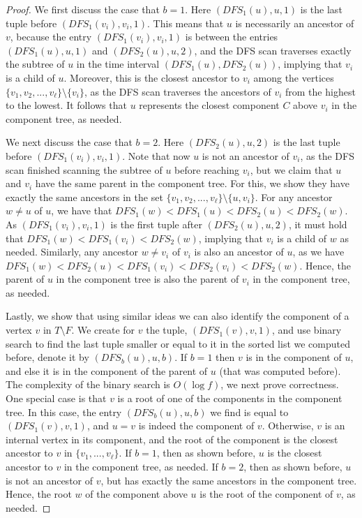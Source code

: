 \begin{proof}
We first discuss the case that $b=1$. Here $(DFS_1(u),u,1)$ is the last tuple before $(DFS_1(v_i),v_i,1)$. This means that $u$ is necessarily an ancestor of $v$, because the entry $(DFS_1(v_i),v_i,1)$ is between the entries $(DFS_1(u),u,1)$ and $(DFS_2(u),u,2)$, and the DFS scan traverses exactly the subtree of $u$ in the time interval $(DFS_1(u),DFS_2(u))$, implying that $v_i$ is a child of $u$. Moreover, this is the closest ancestor to $v_i$ among the vertices $\{v_1,v_2,...,v_{\ell}\} \setminus \{v_i\}$, as the DFS scan traverses the ancestors of $v_i$ from the highest to the lowest. It follows that $u$ represents the closest component $C$ above $v_i$ in the component tree, as needed.  

We next discuss the case that $b=2$. Here $(DFS_2(u),u,2)$ is the last tuple before $(DFS_1(v_i),v_i,1)$. Note that now $u$ is not an ancestor of $v_i$, as the DFS scan finished scanning the subtree of $u$ before reaching $v_i$, but we claim that $u$ and $v_i$ have the same parent in the component tree. For this, we show they have exactly the same ancestors in the set $\{v_1,v_2,...,v_{\ell}\} \setminus \{u,v_i\}.$ For any ancestor $w\neq u$ of $u$, we have that $DFS_1(w) < DFS_1(u) < DFS_2(u) < DFS_2(w)$. As $(DFS_1(v_i),v_i,1)$ is the first tuple after $(DFS_2(u),u,2)$, it must hold that $DFS_1(w) < DFS_1(v_i) <  DFS_2(w)$, implying that $v_i$ is a child of $w$ as needed. Similarly, any ancestor $w \neq v_i$ of $v_i$ is also an ancestor of $u$, as we have $DFS_1(w) < DFS_2(u) < DFS_1(v_i) < DFS_2(v_i) < DFS_2(w)$.
Hence, the parent of $u$ in the component tree is also the parent of $v_i$ in the component tree, as needed.  
 
Lastly, we show that using similar ideas we can also identify the component of a vertex $v$ in $T \setminus F$. We create for $v$ the tuple, $(DFS_1(v),v,1)$, and use binary search to find the last tuple smaller or equal to it in the sorted list we computed before, denote it by $(DFS_b(u),u,b)$. 
If $b=1$ then $v$ is in the component of $u$, and else it is in the component of the parent of $u$ (that was computed before). The complexity of the binary search is $O(\log{f})$, we next prove correctness. 
One special case is that $v$ is a root of one of the components in the component tree. In this case, the entry $(DFS_b(u),u,b)$ we find is equal to $(DFS_1(v),v,1)$, and $u=v$ is indeed the component of $v$. Otherwise, $v$ is an internal vertex in its component, and the root of the component is the closest ancestor to $v$ in $\{v_1,...,v_{\ell}\}$.
If $b=1$, then as shown before, $u$ is the closest ancestor to $v$ in the component tree, as needed. If $b=2$, then as shown before, $u$ is not an ancestor of $v$, but has exactly the same ancestors in the component tree. Hence, the root $w$ of the component above $u$ is the root of the component of $v$, as needed.    
\end{proof} 


